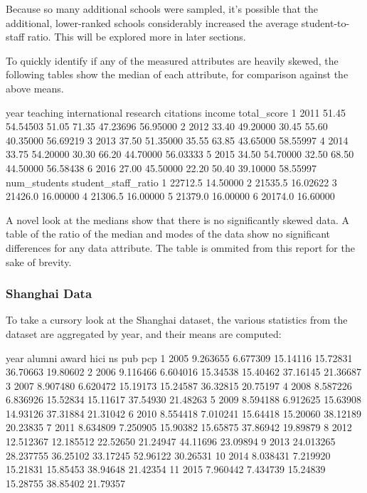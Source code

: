 \documentclass[12pt]{article}
\begin{document}
Because so many additional schools were sampled, it's possible that the additional, lower-ranked schools considerably increased the average student-to-staff ratio. This will be explored more in later sections.

To quickly identify if any of the measured attributes are heavily skewed, the following tables show the median of each attribute, for comparison against the above means.
\begin{Schunk}
\begin{Soutput}
  year teaching international research citations   income total_score
1 2011    51.45      54.54503    51.05     71.35 47.23696    56.95000
2 2012    33.40      49.20000    30.45     55.60 40.35000    56.69219
3 2013    37.50      51.35000    35.55     63.85 43.65000    58.55997
4 2014    33.75      54.20000    30.30     66.20 44.70000    56.03333
5 2015    34.50      54.70000    32.50     68.50 44.50000    56.58438
6 2016    27.00      45.50000    22.20     50.40 39.10000    58.55997
  num_students student_staff_ratio
1      22712.5            14.50000
2      21535.5            16.02622
3      21426.0            16.00000
4      21306.5            16.00000
5      21379.0            16.00000
6      20174.0            16.60000
\end{Soutput}
\end{Schunk}

A novel look at the medians show that there is no significantly skewed data. A table of the ratio of the median and modes of the data show no significant differences for any data attribute. The table is ommited from this report for the sake of brevity.

\subsubsection{Shanghai Data}

To take a cursory look at the Shanghai dataset, the various statistics from the dataset are aggregated by year, and their means are computed:

\begin{Schunk}
\begin{Soutput}
   year    alumni     award     hici       ns      pub      pcp
1  2005  9.263655  6.677309 15.14116 15.72831 36.70663 19.80602
2  2006  9.116466  6.604016 15.34538 15.40462 37.16145 21.36687
3  2007  8.907480  6.620472 15.19173 15.24587 36.32815 20.75197
4  2008  8.587226  6.836926 15.52834 15.11617 37.54930 21.48263
5  2009  8.594188  6.912625 15.63908 14.93126 37.31884 21.31042
6  2010  8.554418  7.010241 15.64418 15.20060 38.12189 20.23835
7  2011  8.634809  7.250905 15.90382 15.65875 37.86942 19.89879
8  2012 12.512367 12.185512 22.52650 21.24947 44.11696 23.09894
9  2013 24.013265 28.237755 36.25102 33.17245 52.96122 30.26531
10 2014  8.038431  7.219920 15.21831 15.85453 38.94648 21.42354
11 2015  7.960442  7.434739 15.24839 15.28755 38.85402 21.79357
\end{Soutput}
\end{Schunk}
\end{document}
